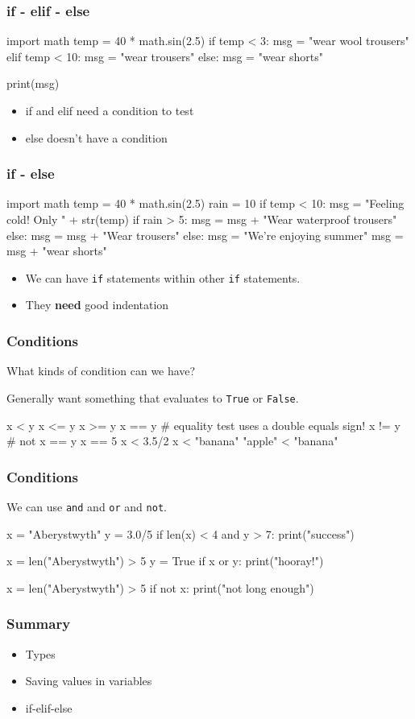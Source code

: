 \documentclass{beamer}
\begin{document}
\begin{frame}[fragile]
\frametitle{if - elif - else}
\begin{code}
import math
temp = 40 * math.sin(2.5)
if temp < 3:
   msg = "wear wool trousers"
elif temp < 10:
   msg = "wear trousers"
else:
   msg = "wear shorts"
  
print(msg)
\end{code}
\begin{itemize}
\item if and elif need a condition to test
\item else doesn't have a condition
\end{itemize}
\end{frame}

\begin{frame}[fragile]
\frametitle{if - else}
\begin{code}
import math
temp = 40 * math.sin(2.5)
rain = 10
if temp < 10:
   msg = "Feeling cold! Only " + str(temp)
   if rain > 5:
      msg = msg + "Wear waterproof trousers"
   else:
      msg = msg + "Wear trousers"
else:
   msg = "We're enjoying summer"
   msg = msg + "wear shorts"
\end{code}
\begin{itemize}
\item We can have {\tt if} statements within other {\tt if}
statements.
\item They {\bf need} good indentation
\end{itemize}
\end{frame}

\begin{frame}[fragile]
\frametitle{Conditions}
What kinds of condition can we have?

Generally want something that evaluates to {\tt True} or {\tt False}.

\begin{code}
x < y
x <= y
x >= y
x == y    # equality test uses a double equals sign!
x != y    # not x == y 
x == 5
x < 3.5/2
x < "banana"
"apple" < "banana"
\end{code}
\end{frame}



\begin{frame}[fragile]
\frametitle{Conditions}
We can use {\tt and} and {\tt or} and {\tt not}.

\begin{code}
x = "Aberystwyth"
y = 3.0/5
if len(x) < 4 and y > 7:
   print("success")

x = len("Aberystwyth") > 5
y = True
if x or y:
   print("hooray!")

x = len("Aberystwyth") > 5
if not x:
   print("not long enough")
\end{code}
\end{frame}

\begin{frame}
\frametitle{Summary}
\begin{itemize}
\item Types
\item Saving values in variables
\item if-elif-else
\end{itemize}
\end{frame}
\end{document}
